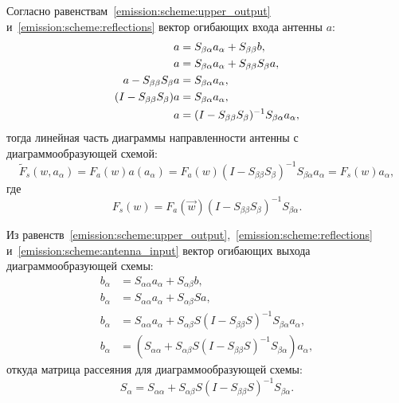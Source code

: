 Согласно равенствам~\eqref{emission:scheme:upper_output} и~\eqref{emission:scheme:reflections} вектор огибающих входа антенны $a$:
\begin{align}
    a & = S_{\beta \alpha} a_\alpha + S_{\beta \beta} b , \notag \\
    a & = S_{\beta \alpha} a_\alpha + S_{\beta \beta} S_\beta a , \notag \\
    a - S_{\beta \beta} S_\beta a & = S_{\beta \alpha} a_\alpha , \notag \\
    ( I - S_{\beta \beta} S_\beta ) a & = S_{\beta \alpha} a_\alpha , \notag \\
    a & = ( I - S_{\beta \beta} S_\beta )^{-1} S_{\beta \alpha} a_\alpha , \label{emission:scheme:antenna_input}
\end{align}
тогда линейная часть диаграммы направленности антенны с диаграммообразующей схемой:
\[
    \widetilde{F}_s(w, a_\alpha)
    = F_a(w) a(a_\alpha)
    = F_a(w) ( I - S_{\beta \beta} S_\beta )^{-1} S_{\beta \alpha} a_\alpha
    = F_s(w) a_\alpha,
\]
где
\[
    F_s(w) = F_a(\vec{w}) ( I - S_{\beta \beta} S_\beta )^{-1} S_{\beta \alpha} .
\]

Из равенств~\eqref{emission:scheme:upper_output},~\eqref{emission:scheme:reflections} и~\eqref{emission:scheme:antenna_input} вектор огибающих выхода
диаграммообразующей схемы:
\begin{align*}
    b_\alpha & = S_{\alpha \alpha} a_\alpha + S_{\alpha \beta} b , \\
    b_\alpha & = S_{\alpha \alpha} a_\alpha + S_{\alpha \beta} S a , \\
    b_\alpha & = S_{\alpha \alpha} a_\alpha + S_{\alpha \beta} S ( I - S_{\beta \beta} S )^{-1} S_{\beta \alpha} a_\alpha , \\
    b_\alpha & = ( S_{\alpha \alpha} + S_{\alpha \beta} S ( I - S_{\beta \beta} S )^{-1} S_{\beta \alpha} ) a_\alpha ,
\end{align*}
откуда матрица рассеяния для диаграммообразующей схемы:
\[
    S_\alpha = S_{\alpha \alpha} + S_{\alpha \beta} S ( I - S_{\beta \beta} S )^{-1} S_{\beta \alpha} .
\]
